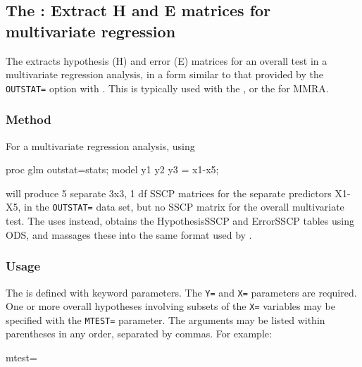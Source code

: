 
\subsection{The : Extract H and E matrices for multivariate regression}\label{mac:hemreg}

The  extracts hypothesis (H) and error (E) matrices for an
overall test in a multivariate regression analysis, in a form similar to
that provided by the \texttt{OUTSTAT=} option with .  This is typically
used with the , or the  for MMRA.

\subsubsection*{Method}

For a multivariate regression analysis, using

\begin{listing}
 proc glm outstat=stats;
    model y1 y2 y3 = x1-x5;
\end{listing}

 will produce 5 separate 3x3, 1 df SSCP matrices for the separate
predictors X1-X5, in the \texttt{OUTSTAT=} data set, but no SSCP matrix for
the overall multivariate test. The  uses  instead,
obtains the HypothesisSSCP and ErrorSSCP tables using ODS, and massages
these into the same format used by .

\subsubsection*{Usage}

The  is defined with keyword parameters.  The \texttt{Y=} and
\texttt{X=} parameters are required.  One or more overall hypotheses involving
subsets of the \texttt{X=} variables may be specified with the \texttt{MTEST=} parameter.
The arguments may be listed within parentheses in any order, separated
by commas. For example:

\begin{listing}
      mtest=%
\end{listing}

